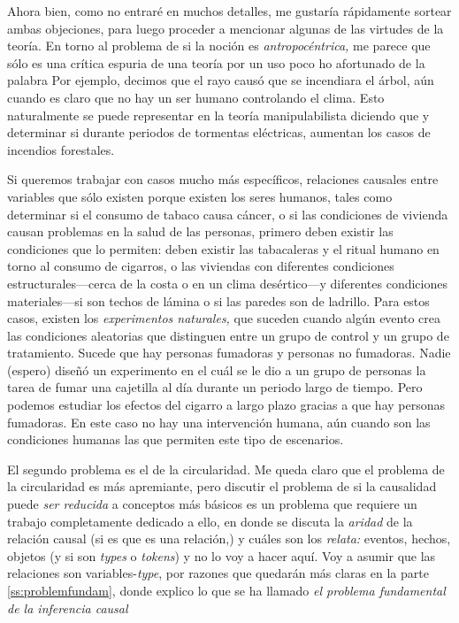 Ahora bien, como no entraré en muchos detalles, me gustaría
rápidamente sortear ambas objeciones, para luego proceder a
mencionar algunas de las virtudes de la teoría. En torno al
problema de si la noción es \emph{antropocéntrica,} me
parece que sólo es una crítica espuria de una teoría por un
uso poco ho	afortunado de la palabra  Por
ejemplo, decimos que el rayo causó que se incendiara el
árbol, aún cuando es claro que no hay un ser humano
controlando el clima. Esto naturalmente se puede representar
en la teoría manipulabilista diciendo que  y determinar si durante
periodos de tormentas eléctricas, aumentan los casos de
incendios forestales. 

Si queremos trabajar con casos mucho más específicos,
relaciones causales entre variables que sólo existen porque
existen los seres humanos, tales como determinar si el
consumo de tabaco causa cáncer, o si las condiciones de
vivienda causan problemas en la salud de las personas,
primero deben existir las condiciones que lo permiten: deben
existir las tabacaleras y el ritual humano en torno al
consumo de cigarros, o las viviendas con diferentes
condiciones estructurales---cerca de la costa o en un clima
desértico---y diferentes condiciones materiales---si son
techos de lámina o si las paredes son de ladrillo. Para
estos casos, existen los \emph{experimentos naturales,} que
suceden cuando algún evento crea las condiciones aleatorias
que distinguen entre un grupo de control y un grupo de
tratamiento. Sucede que hay personas fumadoras y personas no
fumadoras. Nadie (espero) diseñó un experimento en el cuál
se le dio a un grupo de personas la tarea de fumar una
cajetilla al día durante un periodo largo de tiempo. Pero
podemos estudiar los efectos del cigarro a largo plazo
gracias a que hay personas fumadoras. En este caso no hay
una intervención humana, aún cuando son las condiciones
humanas las que permiten este tipo de escenarios. 

El segundo problema es el de la circularidad. Me queda claro
que el problema de la circularidad es más apremiante, pero
discutir el problema de si la causalidad puede \emph{ser
reducida} a conceptos más básicos es un problema que
requiere un trabajo completamente dedicado a ello, en donde
se discuta la \emph{aridad} de la relación causal (si es que
es una relación,) y cuáles son los \emph{relata:} eventos,
hechos, objetos (y si son \emph{types} o \emph{tokens}) y no
lo voy a hacer aquí. Voy a asumir que las relaciones son
variables-\emph{type}, por razones que quedarán más claras
en la parte \ref{ss:problemfundam}, donde explico lo que
se ha llamado \emph{el problema fundamental de la inferencia
causal}

